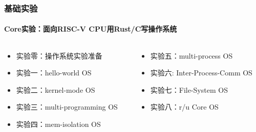 \begin{frame}
\frametitle{基础实验}
\framesubtitle{Core实验：面向RISC-V CPU用Rust/C写操作系统} %
\begin{columns}
	
\begin{column}{0.5\textwidth}
\begin{itemize}
		\item 实验零：操作系统实验准备
		\item 实验一：hello-world OS
		\item 实验二：kernel-mode OS
		\item 实验三：multi-programming OS
		\item 实验四：mem-isolation OS
\end{itemize}
\end{column}
 
\begin{column}{0.5\textwidth}
    \begin{itemize}
		\item 实验五：multi-process OS
		\item 实验六: Inter-Process-Comm OS
		\item 实验七：File-System OS
		\item 实验八：r/u Core OS
	\end{itemize}
\end{column}

\end{columns}

\end{frame}



